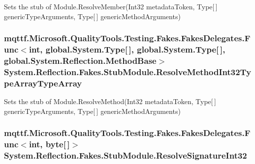 Sets the stub of Module.\-Resolve\-Member(\-Int32 metadata\-Token, Type\mbox{[}$\,$\mbox{]} generic\-Type\-Arguments, Type\mbox{[}$\,$\mbox{]} generic\-Method\-Arguments)

\hypertarget{class_system_1_1_reflection_1_1_fakes_1_1_stub_module_a2614249c9fcce245dd9805fcc5d6c2fb}{
\subsubsection[{Resolve\-Method\-Int32\-Type\-Array\-Type\-Array}]{\setlength{\rightskip}{0pt plus 5cm}mqttf.\-Microsoft.\-Quality\-Tools.\-Testing.\-Fakes.\-Fakes\-Delegates.\-Func$<$int, global.\-System.\-Type\mbox{[}$\,$\mbox{]}, global.\-System.\-Type\mbox{[}$\,$\mbox{]}, global.\-System.\-Reflection.\-Method\-Base$>$ System.\-Reflection.\-Fakes.\-Stub\-Module.\-Resolve\-Method\-Int32\-Type\-Array\-Type\-Array}}\label{class_system_1_1_reflection_1_1_fakes_1_1_stub_module_a2614249c9fcce245dd9805fcc5d6c2fb}


Sets the stub of Module.\-Resolve\-Method(\-Int32 metadata\-Token, Type\mbox{[}$\,$\mbox{]} generic\-Type\-Arguments, Type\mbox{[}$\,$\mbox{]} generic\-Method\-Arguments)

\hypertarget{class_system_1_1_reflection_1_1_fakes_1_1_stub_module_af373e036405d13f63ba3dc38aeab647b}{
\subsubsection[{Resolve\-Signature\-Int32}]{\setlength{\rightskip}{0pt plus 5cm}mqttf.\-Microsoft.\-Quality\-Tools.\-Testing.\-Fakes.\-Fakes\-Delegates.\-Func$<$int, byte\mbox{[}$\,$\mbox{]}$>$ System.\-Reflection.\-Fakes.\-Stub\-Module.\-Resolve\-Signature\-Int32}}\label{class_system_1_1_reflection_1_1_fakes_1_1_stub_module_af373e036405d13f63ba3dc38aeab647b}


